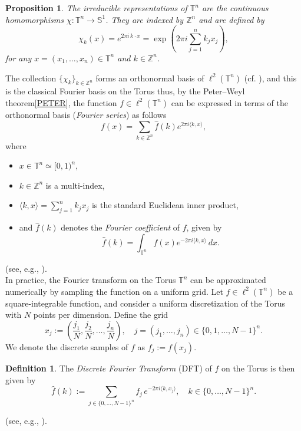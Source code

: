 \documentclass[11pt]{article}
\newtheorem{prop}[thm]{Proposition}
\theoremstyle{definition}
\newtheorem{defn}[thm]{Definition}
\theoremstyle{remark}
\numberwithin{equation}{section}
\begin{document}
\begin{prop}
    The irreducible representations of $\mathbb{T}^n$ are the continuous homomorphisms $\chi: \mathbb{T}^n \to \mathbb{S}^1$. They are indexed by $\mathbb{Z}^n$ and are defined by
    \[
        \chi_k(x) = e^{2\pi i\, k \cdot x} = \exp\left(2\pi i \sum_{j=1}^n k_j x_j\right),
    \]
    for any $x = (x_1, \dots, x_n) \in \mathbb{T}^n$ and $k \in \mathbb{Z}^n$.
\end{prop}
The collection $\{ \chi_k \}_{k \in \mathbb{Z}^n}$ forms an orthonormal basis of $\ell^2(\mathbb{T}^n)$ (cf. \cite{Toro1,Toro2}), and this is the classical Fourier basis on the Torus thus, by the Peter–Weyl theorem\ref{PETER}, the function $f \in \ell^2(\mathbb{T}^n)$ can be expressed in terms of the orthonormal basis (\textit{Fourier series}) as follows
\[
f(x) = \sum_{k \in \mathbb{Z}^n} \widehat{f}(k) e^{2\pi i \langle k, x \rangle},
\]
where
\begin{itemize}
    \item  $x \in \mathbb{T}^n \simeq [0,1)^n$,
\item $k \in \mathbb{Z}^n$ is a multi-index,
\item $\langle k, x \rangle = \sum_{j=1}^n k_j x_j$ is the standard Euclidean inner product,
\item and $\widehat{f}(k)$ denotes the \textit{Fourier coefficient} of $f$, given by
\[
\widehat{f}(k) = \int_{\mathbb{T}^n} f(x) e^{-2\pi i \langle k, x \rangle} \, dx.
\]
\end{itemize}
(see, e.g., \cite{ruzhansky2009pseudo}).\\%

In practice, the Fourier transform on the Torus $\mathbb{T}^n$ can be approximated numerically by sampling the function on a uniform grid. Let $f \in \ell^2(\mathbb{T}^n)$ be a square-integrable function, and consider a uniform discretization of the Torus with $N$ points per dimension. Define the grid
\[
x_j := \left( \frac{j_1}{N}, \frac{j_2}{N}, \dots, \frac{j_n}{N} \right), \quad j = (j_1, \dots, j_n) \in \{0, 1, \dots, N-1\}^n.
\]
We denote the discrete samples of $f$ as $f_j := f(x_j)$.

\begin{defn}
    The \textit{Discrete Fourier Transform} (DFT) of $f$ on the Torus is then given by
\[
\widehat{f}(k) := \sum_{j \in \{0, \dots, N-1\}^n} f_j \, e^{-2\pi i \langle k, x_j \rangle}, \quad k \in \{0, \dots, N-1\}^n.
\]
\end{defn}
(see, e.g., \cite{Toro1,Toro2,FFTmultidimensional}).\\%
\end{document}
